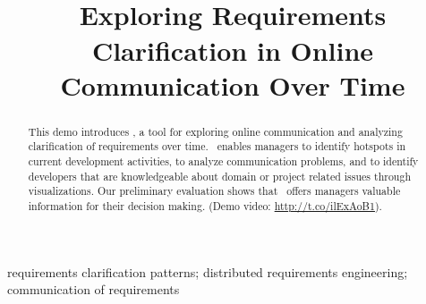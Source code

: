 
\title{\viss\\Exploring Requirements Clarification in Online Communication Over Time}


\author{
}

\maketitle


\begin{abstract}
This demo introduces \viss, a tool for exploring online communication and analyzing clarification of requirements over time.
\viss\ enables managers to identify hotspots in current development activities, to analyze communication problems, and to identify developers that are knowledgeable about domain or project related issues through visualizations.
Our preliminary evaluation shows that \viss\ offers managers valuable information for their decision making.
(Demo video: \url{http://t.co/ilExAoB1}).
\end{abstract}

\begin{IEEEkeywords}
requirements clarification patterns; distributed requirements engineering; communication of requirements
\end{IEEEkeywords}

